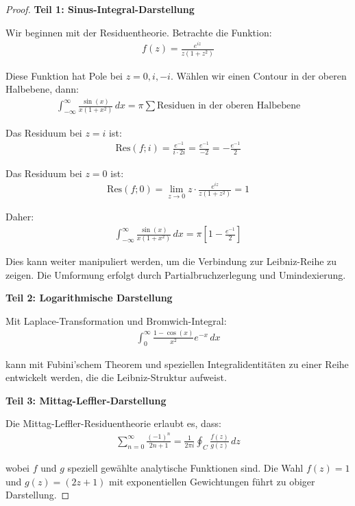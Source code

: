 \documentclass[a4paper,12pt,twoside]{report}
\theoremstyle{definition}
\begin{document}
\begin{proof}
\textbf{Teil 1: Sinus-Integral-Darstellung}

Wir beginnen mit der Residuentheorie. Betrachte die Funktion:
\begin{align}
	f(z) = \frac{e^{iz}}{z(1+z^2)}
\end{align}

Diese Funktion hat Pole bei $z = 0, i, -i$. Wählen wir einen Contour in der oberen Halbebene, dann:
\begin{align}
	\int_{-\infty}^{\infty} \frac{\sin(x)}{x(1+x^2)} \, dx = \pi \sum \text{Residuen in der oberen Halbebene}
\end{align}

Das Residuum bei $z = i$ ist:
\begin{align}
	\text{Res}(f; i) = \frac{e^{-1}}{i \cdot 2i} = \frac{e^{-1}}{-2} = -\frac{e^{-1}}{2}
\end{align}

Das Residuum bei $z = 0$ ist:
\begin{align}
	\text{Res}(f; 0) = \lim_{z \to 0} z \cdot \frac{e^{iz}}{z(1+z^2)} = 1
\end{align}

Daher:
\begin{align}
	\int_{-\infty}^{\infty} \frac{\sin(x)}{x(1+x^2)} \, dx = \pi \left[ 1 - \frac{e^{-1}}{2} \right]
\end{align}

Dies kann weiter manipuliert werden, um die Verbindung zur Leibniz-Reihe zu zeigen. Die Umformung erfolgt durch Partialbruchzerlegung und Umindexierung.

\textbf{Teil 2: Logarithmische Darstellung}

Mit Laplace-Transformation und Bromwich-Integral:
\begin{align}
	\int_0^{\infty} \frac{1 - \cos(x)}{x^2} e^{-x} \, dx
\end{align}

kann mit Fubini'schem Theorem und speziellen Integralidentitäten zu einer Reihe entwickelt werden, die die Leibniz-Struktur aufweist.

\textbf{Teil 3: Mittag-Leffler-Darstellung}

Die Mittag-Leffler-Residuentheorie erlaubt es, dass:
\begin{align}
	\sum_{n=0}^{\infty} \frac{(-1)^n}{2n+1} = \frac{1}{2\pi i} \oint_C \frac{f(z)}{g(z)} \, dz
\end{align}

wobei $f$ und $g$ speziell gewählte analytische Funktionen sind. Die Wahl $f(z) = 1$ und $g(z) = (2z+1)$ mit exponentiellen Gewichtungen führt zu obiger Darstellung.


\end{proof}
\end{document}
